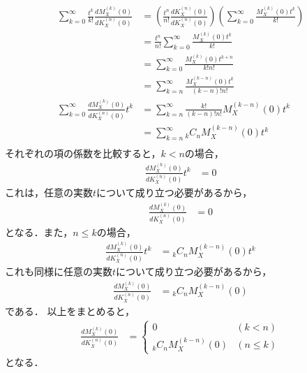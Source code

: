 \documentclass[dvipdfmx]{jsarticle}
\begin{document}
 \begin{align}
  \sum_{k=0}^\infty\frac{t^k}{k!}\frac{dM_X^{\left(k\right)}\left(0\right)}{dK_X^{\left(n\right)}\left(0\right)}&=\left(\frac{t^n}{n!}\frac{dK_X^{\left(n\right)}\left(0\right)}{dK_X^{\left(n\right)}\left(0\right)}\right)\left(\sum_{k=0}^\infty\frac{M_X^{\left(k\right)}\left(0\right)t^k}{k!}\right)\nonumber\\
  &=\frac{t^n}{n!}\sum_{k=0}^\infty\frac{M_X^{\left(k\right)}\left(0\right)t^k}{k!}\nonumber\\
  &=\sum_{k=0}^\infty\frac{M_X^{\left(k\right)}\left(0\right)t^{k+n}}{k!n!}\nonumber\\
  &=\sum_{k=n}^\infty\frac{M_X^{\left(k-n\right)}\left(0\right)t^k}{\left(k-n\right)!n!}\nonumber\\
  \sum_{k=0}^\infty\frac{dM_X^{\left(k\right)}\left(0\right)}{dK_X^{\left(n\right)}\left(0\right)}t^k&=\sum_{k=n}^\infty\frac{k!}{\left(k-n\right)!n!}M_X^{\left(k-n\right)}\left(0\right)t^k\nonumber\\
  &=\sum_{k=n}^\infty{}_kC_{n}M_X^{\left(k-n\right)}\left(0\right)t^k\nonumber\\
 \end{align}
それぞれの項の係数を比較すると，$k<n$の場合，
 \begin{align}
  \frac{dM_X^{\left(k\right)}\left(0\right)}{dK_X^{\left(n\right)}\left(0\right)}t^k&=0
 \end{align}
これは，任意の実数$t$について成り立つ必要があるから，
 \begin{align}
  \frac{dM_X^{\left(k\right)}\left(0\right)}{dK_X^{\left(n\right)}\left(0\right)}&=0
 \end{align}
となる．また，$n\le k$の場合，
 \begin{align}
  \frac{dM_X^{\left(k\right)}\left(0\right)}{dK_X^{\left(n\right)}\left(0\right)}t^k&={}_kC_{n}M_X^{\left(k-n\right)}\left(0\right)t^k
 \end{align}
これも同様に任意の実数$t$について成り立つ必要があるから，
 \begin{align}
  \frac{dM_X^{\left(k\right)}\left(0\right)}{dK_X^{\left(n\right)}\left(0\right)}&={}_kC_{n}M_X^{\left(k-n\right)}\left(0\right)
 \end{align}
である．
以上をまとめると，
 \begin{align}
  \frac{dM_X^{\left(k\right)}\left(0\right)}{dK_X^{\left(n\right)}\left(0\right)}&=
  \begin{cases}
   0&\left(k<n\right)\\
   {}_kC_{n}M_X^{\left(k-n\right)}\left(0\right)&\left(n\le k\right)
  \end{cases}
 \end{align}
となる．
\end{document}
